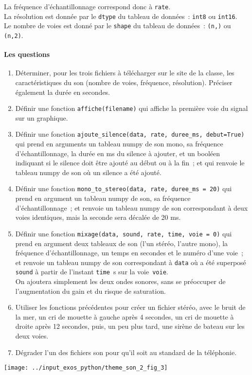 La fréquence d'échantillonnage correspond donc à \verb#rate#.\\
La
résolution est donnée par le \verb#dtype# du tableau de données~: 
\verb#int8# ou \verb#int16#. \\
Le
nombre de voies est donné par le \verb#shape# du tableau de données~:
\verb#(n,)# ou \verb#(n,2)#. 

\newpage

\paragraph{Les questions}

\begin{enumerate}[resume*]
\item 
  Déterminer, pour les trois fichiers à télécharger sur le site de la
  classe, les caractéristiques du son (nombre de voies, fréquence,
  résolution). Préciser également la durée en secondes.  
\item 
  Définir une fonction \verb#affiche(filename)# qui affiche la
  première voie du signal sur un graphique. 
\item 
  Définir une fonction
  \verb#ajoute_silence(data, rate, duree_ms, debut=True)# 
  qui prend en arguments un tableau numpy de son mono, sa fréquence
  d'échantillonnage, la durée en ms du silence à ajouter, et un
  booléen indiquant si le silence doit être ajouté au début ou à la
  fin~; et qui renvoie le tableau numpy de son où un silence a été
  ajouté. 
\item 
  Définir une fonction
  \verb#mono_to_stereo(data, rate, duree_ms = 20)#
  qui prend en argument un tableau numpy de son, sa fréquence
  d'échantillonnage~; et renvoie un tableau numpy de son correspondant
  à deux voies identiques, mais la seconde sera décalée de 20 ms.
\item 
  Définir une fonction
  \verb#mixage(data, sound, rate, time, voie = 0)#
  qui prend en argument deux tableaux de son (l'un stéréo, l'autre
  mono), 
  la fréquence d'échantillonnage, un temps en secondes et le numéro
  d'une voie~; et renvoie un tableau numpy de son
  correspondant à \verb#data# où a été superposé \verb#sound# à partir
  de l'instant \verb#time#~s sur la voie~\verb#voie#. \\
  On ajoutera simplement les deux ondes sonores, sans se préoccuper de
  l'augmentation du gain et du risque de saturation. 
\item 
  Utiliser les fonctions précédentes pour créer un fichier stéréo,
  avec le bruit de la mer, un cri de mouette à gauche après 4
  secondes, un cri de mouette à droite après 12 secondes, puis, un peu
  plus tard, une sirène de bateau sur les deux voies. 

\item 
  Dégrader l'un des fichiers son pour qu'il soit au standard de la
  téléphonie. 
\end{enumerate}

\vspace*{1cm}

\centerline{\texttt{[image: ../input\_exos\_python/theme\_son\_2\_fig\_3]}}
